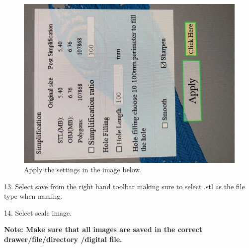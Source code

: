 \begin{figure}[!htp]
\centering
\includegraphics[scale=1, angle=270]{3D_End}
\caption{Apply the settings in the image below. }
\label{img:Apply}
\end{figure}

\newpage

13. Select save from the right hand toolbar making sure to select .stl as the file type when naming.

14. Select scale image.

\textbf{Note: Make sure that all images are saved in the correct drawer/file/directory
/digital file.}



